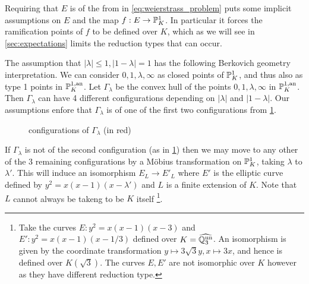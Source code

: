 Requiring that $E$ is of the from in \eqref{eq:weierstrass_problem} puts some implicit assumptions on $E$ and the map $f: E \to \mathbb{P}^{1}_K$.
In particular it forces the ramification points of $f$ to be defined over $K$, which as we will see in \cref{sec:expectations} limits the reduction types that can occur. 

The assumption that $|\lambda| \le 1, |1 - \lambda| = 1$ has the following Berkovich geometry interpretation.
We can consider $0, 1, \lambda, \infty$ as closed points of $\mathbb{P}^{1}_K$, and thus also as type 1 points in $\mathbb{P}^{1, \text{an}}_K$.
Let  $\Gamma_\lambda$ be the convex hull of the points $0, 1, \lambda, \infty$ in $\mathbb{P}^{1, \text{an}}_K$. 
Then  $\Gamma_\lambda$ can have 4 different configurations depending on $|\lambda|$ and $|1-\lambda|$. 
Our assumptions enfore that $\Gamma_\lambda$ is of one of the first two configurations from \cref{fig:configurations_of_gamma_lambda}.
\begin{figure}[ht]
    \centering
    \caption{configurations of $\Gamma_\lambda$ (in red)}
    \label{fig:configurations_of_gamma_lambda}
\end{figure}
If  $\Gamma_\lambda$ is not of the second configuration (as in \cref{fig:configurations_of_gamma_lambda}) then we may move to any other of the 3 remaining configurations by a Möbius transformation on $\mathbb{P}^{1}_K$, taking $\lambda$ to $\lambda'$. 
This will induce an isomorphism $E_L \to E'_L$ where $E'$ is the elliptic curve defined by $y^2 = x(x-1)(x-\lambda')$ and $L$ is a finite extension of $K$. 
Note  that $L$ cannot always be takeng to be $K$ itself
\footnote{Take the curves $E: y^2 = x(x -1)(x-3)$ and $E': y^2 = x(x-1)(x-1 /3)$ defined over $K = \widehat{\mathbb{Q}_3^{\text{un}}}$.
An isomorphism is given by the coordinate transformation $y\mapsto 3\sqrt{3} y, x\mapsto 3x$, and hence is defined over $K(\sqrt{3} )$. The curves $E, E'$ are not isomorphic over $K$ however as they have different reduction type.}.













